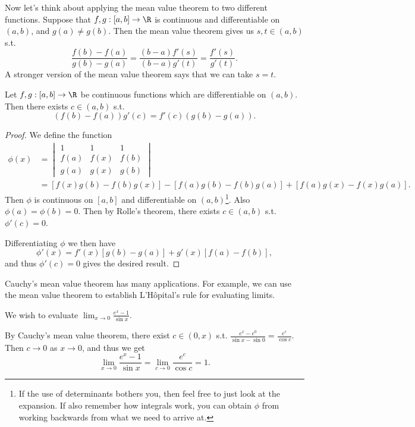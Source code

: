 Now let's think about applying the mean value theorem to two different functions. Suppose that $f, g : [a, b] \rightarrow \R$ is continuous and differentiable on $(a, b)$, and $g(a) \neq g(b)$. Then the mean value theorem gives us $s, t \in (a, b)$ s.t.
$$
	\frac{f(b) - f(a)}{g(b) - g(a)} = \frac{(b - a)f'(s)}{(b - a)g'(t)} = \frac{f'(s)}{g'(t)}.
$$
A stronger version of the mean value theorem says that we can take $s = t$.

\begin{theorem}
	Let $f, g : [a, b] \rightarrow \R$ be continuous functions which are differentiable on $(a, b)$. Then there exists $c \in (a, b)$ s.t.
	$$
	(f(b) - f(a))g'(c) = f'(c)(g(b) - g(a)).
	$$
\end{theorem}
\begin{proof}
	We define the function
	\begin{align*}
		\phi(x) &= \begin{vmatrix}
			1 & 1 & 1 \\
			f(a) & f(x) & f(b) \\
			g(a) & g(x) & g(b)
			\end{vmatrix}  \\
		&= \left[f(x)g(b) - f(b)g(x)\right] - [f(a)g(b) - f(b) g(a)] + [f(a) g(x) - f(x) g(a)].
	\end{align*}
	Then $\phi$ is continuous on $[a, b]$ and differentiable on $(a, b)$\footnote{If the use of determinants bothers you, then feel free to just look at the expansion. If also remember how integrals work, you can obtain $\phi$ from working backwards from what we need to arrive at.}. Also $\phi(a) =\phi(b) = 0$. Then by Rolle's theorem, there exists $c \in (a, b)$ s.t. $\phi'(c) = 0$.
	
	Differentiating $\phi$ we then have 
	$$
	\phi'(x) = f'(x)[g(b) - g(a)] + g'(x)[f(a) - f(b)],
	$$
	and thus $\phi'(c) = 0$ gives the desired result.
\end{proof}

Cauchy's mean value theorem has many applications. For example, we can use the mean value theorem to establish L'Hôpital's rule for evaluating limits.

\begin{example}
	We wish to evaluate $\displaystyle \lim_{x \to 0} \frac{e^x - 1}{\sin x}$.

	By Cauchy's mean value theorem, there exist $c \in (0, x)$ s.t.
	$
	\frac{e^x - e^0}{\sin x - \sin 0} = \frac{e^c}{\cos c}.
	$
	Then $c \rightarrow 0$ as $x \rightarrow 0$, and thus we get
	$$
	\lim_{x \to 0} \frac{e^x - 1}{\sin x} = \lim_{c \to 0}\frac{e^c}{\cos c} = 1.
	$$
\end{example}

